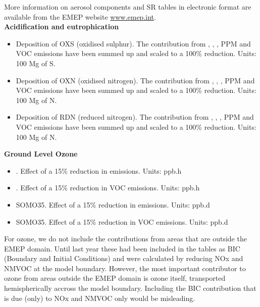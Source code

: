 More information on aerosol components and SR tables in 
electronic format are available from the EMEP website \url{www.emep.int}.\\


\textbf{Acidification and eutrophication}
\begin{itemize}
\item Deposition of OXS (oxidised sulphur). The contribution from \sox,
  \nox, \nhiii, PPM and VOC emissions have been summed up and scaled to a
  100\% reduction. Units: 100 Mg of S.
\item Deposition of OXN (oxidised nitrogen). The contribution from \sox,
  \nox, \nhiii, PPM and VOC emissions have been summed up and scaled to a
  100\% reduction. Units: 100 Mg of N.
\item Deposition of RDN (reduced nitrogen). The contribution from \sox,
  \nox, \nhiii, PPM and VOC emissions have been summed up and scaled to a
  100\% reduction. Units: 100 Mg of N.
\end{itemize}
\vspace{20pt}

\textbf{Ground Level Ozone}
\begin{itemize}
\item \aotucf. Effect of a 15\% reduction in \nox emissions. Units: ppb.h
\item \aotucf. Effect of a 15\% reduction in VOC emissions. Units: ppb.h 
\item SOMO35. Effect of a 15\% reduction in \nox emissions. Units: ppb.d 
\item SOMO35. Effect of a 15\% reduction in VOC emissions. Units: ppb.d 
\end{itemize}
For ozone, we do not include the contributions from areas that are outside the EMEP domain. Until last year these had been included in the tables as BIC (Boundary and Initial Conditions) and were calculated by reducing NOx and NMVOC at the model boundary. However, the most important contributor to ozone from areas outside the EMEP domain is ozone itself, transported hemispherically accross the model boundary. Including the BIC contribution that is due (only) to NOx and NMVOC only would be misleading.
\vspace{20pt}


